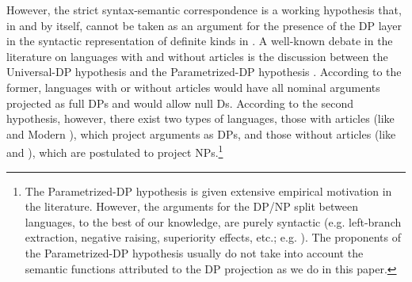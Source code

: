 \documentclass[output=paper
,modfonts
,nonflat]{langsci/langscibook}
\begin{document}
	However, the strict syntax-semantic correspondence is a working hypothesis that, in and by itself, cannot be taken as an argument for the presence of the DP layer in the syntactic representation of definite kinds in . A well-known debate in the literature on languages with and without articles is the discussion between the Universal-DP hypothesis \citep{Longobardi1994,Cinque2005,Pereltsvaig2007} and the Parametrized\hyp{}DP hypothesis \citep{Boskovic2005, Boskovic2008,Boskovic2008a,Boskovic2009}. According to the former, languages with or without articles would have all nominal arguments projected as full DPs and would allow null Ds. According to the second hypothesis, however, there exist two types of languages, those with articles (like  and Modern ), which project arguments as DPs, and those without articles (like  and ), which are postulated to project NPs.\footnote{The Parametrized-DP hypothesis is given extensive empirical motivation in the literature. However, the arguments for the DP/NP split between languages, to the best of our knowledge, are purely syntactic (e.g. left-branch extraction, negative raising, superiority effects, etc.; e.g. \citealt{Boskovic2008}). The proponents of the Parametrized-DP hypothesis usually do not take into account the semantic functions attributed to the DP projection as we do in this paper.}  
	
\end{document}
